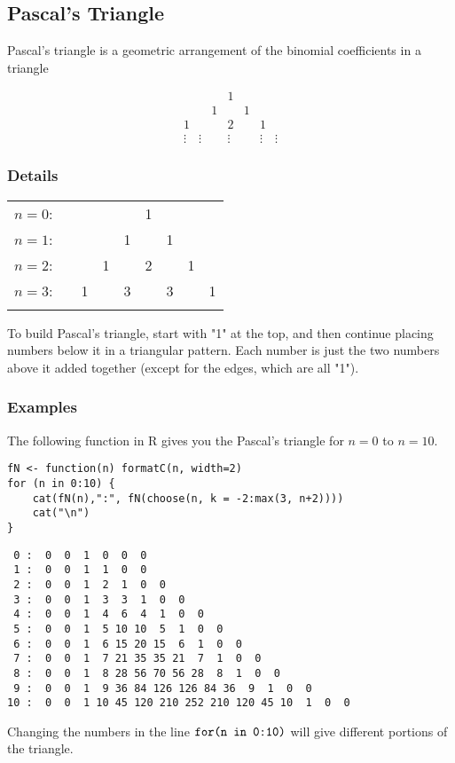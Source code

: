 \documentclass[12pt,a4paper]{article}
\theoremstyle{regla}
\theoremstyle{remark}
\theoremstyle{definition}
\theoremstyle{nonumberbreak}
\begin{document}
\subsection{Pascal's Triangle}
\begin{fbox}
\begin{minipage}{0.97\textwidth}
Pascal's triangle is a geometric arrangement of the binomial coefficients in a triangle

$$
\begin{array}{ccccc}
           & &1&&\\
       & 1   & &    1&\\
    1  &&     2  &&       1\\
  \vdots \quad \vdots && \vdots && \vdots \quad \vdots
\end{array}
$$
\end{minipage}
\end{fbox}
\subsubsection{Details}
\begin{tabular}{rccp{0.3cm}p{0.2cm}cccc}
$n=0$: & & & & &1\\\noalign{\smallskip\smallskip}
$n=1$: & & & &1& &1\\\noalign{\smallskip\smallskip}
$n=2$: & & &1& &2& &1\\\noalign{\smallskip\smallskip}
$n=3$: & &1& &3& &3& &1\\\noalign{\smallskip\smallskip}
\end{tabular}

To build Pascal's triangle, start with "1" at the top, and then continue placing numbers below it in a triangular pattern. Each number is just the two numbers above it added together (except for the edges, which are all "1").

\subsubsection{Examples}
\begin{xmpl}
The following function in R gives you the Pascal's triangle for $n= 0$ to $n=10$.

\begin{lstlisting}
fN <- function(n) formatC(n, width=2)
for (n in 0:10) {
    cat(fN(n),":", fN(choose(n, k = -2:max(3, n+2))))
    cat("\n")
}
\end{lstlisting}

\begin{verbatim}
 0 :  0  0  1  0  0  0
 1 :  0  0  1  1  0  0
 2 :  0  0  1  2  1  0  0
 3 :  0  0  1  3  3  1  0  0
 4 :  0  0  1  4  6  4  1  0  0
 5 :  0  0  1  5 10 10  5  1  0  0
 6 :  0  0  1  6 15 20 15  6  1  0  0
 7 :  0  0  1  7 21 35 35 21  7  1  0  0
 8 :  0  0  1  8 28 56 70 56 28  8  1  0  0
 9 :  0  0  1  9 36 84 126 126 84 36  9  1  0  0
10 :  0  0  1 10 45 120 210 252 210 120 45 10  1  0  0
\end{verbatim}

Changing the numbers in the line $\verb|for(n in 0:10)|$ will give different portions of the triangle.
\end{xmpl}
\end{document}
